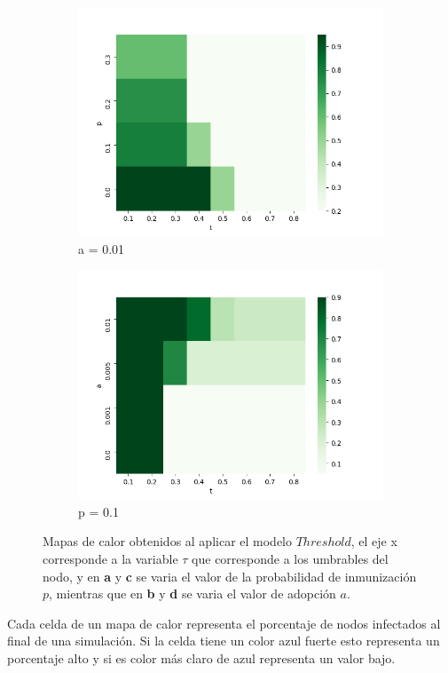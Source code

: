 \documentclass{article}
\begin{document}
\begin{figure}[h]
\begin{subfigure}[b]{0.5\textwidth}
		\includegraphics[width=\textwidth]{../Images/hm03.png}
		\caption{a = 0.01}
		\label{fig:hm03}
	\end{subfigure}
	\begin{subfigure}[b]{0.5\textwidth}
		\includegraphics[width=\textwidth]{../Images/hm04.png}
		\caption{p = 0.1}
		\label{fig:hm04}
	\end{subfigure}
	\label{fig:hm}
	\caption{Mapas de calor obtenidos al aplicar el modelo $Threshold$, el eje x corresponde a la variable $\tau$ que corresponde a los umbrables del nodo, y en \textbf{a} y \textbf{c} se varia el valor de la probabilidad de inmunización $p$, mientras que en \textbf{b} y \textbf{d} se varia el valor de adopción $a$.}
\end{figure}
Cada celda de un mapa de calor representa el porcentaje de nodos infectados al final de una simulación. Si la celda tiene un color azul fuerte esto representa un porcentaje alto y si es color más claro de azul representa un valor bajo.
\newpage
\end{document}
